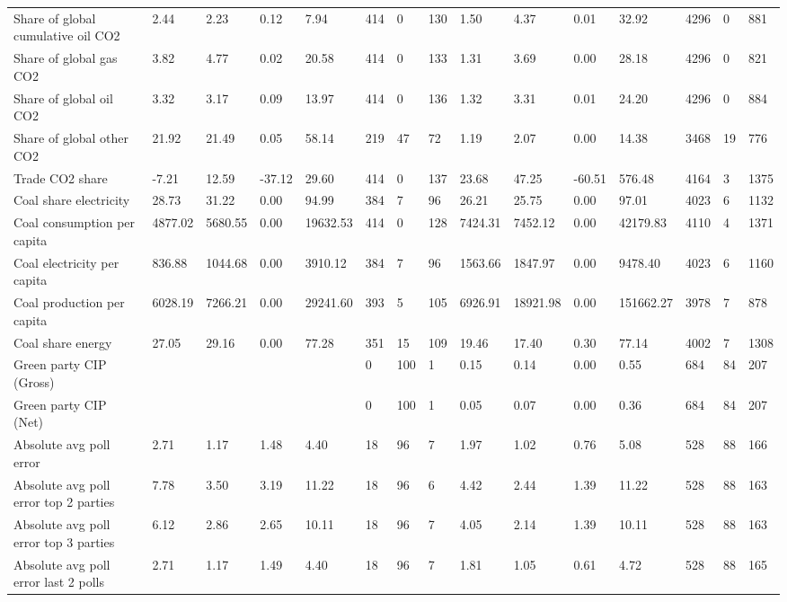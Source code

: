 \begin{longtable}{lllllllllllllll}
\addlinespace
Share of global cumulative oil CO2 & 2.44 & 2.23 & 0.12 & 7.94 & 414 & 0 & 130 & 1.50 & 4.37 & 0.01 & 32.92 & 4296 & 0 & 881\\
Share of global gas CO2 & 3.82 & 4.77 & 0.02 & 20.58 & 414 & 0 & 133 & 1.31 & 3.69 & 0.00 & 28.18 & 4296 & 0 & 821\\
Share of global oil CO2 & 3.32 & 3.17 & 0.09 & 13.97 & 414 & 0 & 136 & 1.32 & 3.31 & 0.01 & 24.20 & 4296 & 0 & 884\\
Share of global other CO2 & 21.92 & 21.49 & 0.05 & 58.14 & 219 & 47 & 72 & 1.19 & 2.07 & 0.00 & 14.38 & 3468 & 19 & 776\\
Trade CO2 share & -7.21 & 12.59 & -37.12 & 29.60 & 414 & 0 & 137 & 23.68 & 47.25 & -60.51 & 576.48 & 4164 & 3 & 1375\\
\addlinespace
Coal share electricity & 28.73 & 31.22 & 0.00 & 94.99 & 384 & 7 & 96 & 26.21 & 25.75 & 0.00 & 97.01 & 4023 & 6 & 1132\\
Coal consumption per capita & 4877.02 & 5680.55 & 0.00 & 19632.53 & 414 & 0 & 128 & 7424.31 & 7452.12 & 0.00 & 42179.83 & 4110 & 4 & 1371\\
Coal electricity per capita & 836.88 & 1044.68 & 0.00 & 3910.12 & 384 & 7 & 96 & 1563.66 & 1847.97 & 0.00 & 9478.40 & 4023 & 6 & 1160\\
Coal production per capita & 6028.19 & 7266.21 & 0.00 & 29241.60 & 393 & 5 & 105 & 6926.91 & 18921.98 & 0.00 & 151662.27 & 3978 & 7 & 878\\
Coal share energy & 27.05 & 29.16 & 0.00 & 77.28 & 351 & 15 & 109 & 19.46 & 17.40 & 0.30 & 77.14 & 4002 & 7 & 1308\\
\addlinespace
Green party CIP (Gross) &  &  &  &  & 0 & 100 & 1 & 0.15 & 0.14 & 0.00 & 0.55 & 684 & 84 & 207\\
Green party CIP (Net) &  &  &  &  & 0 & 100 & 1 & 0.05 & 0.07 & 0.00 & 0.36 & 684 & 84 & 207\\
Absolute avg poll error & 2.71 & 1.17 & 1.48 & 4.40 & 18 & 96 & 7 & 1.97 & 1.02 & 0.76 & 5.08 & 528 & 88 & 166\\
Absolute avg poll error top 2 parties & 7.78 & 3.50 & 3.19 & 11.22 & 18 & 96 & 6 & 4.42 & 2.44 & 1.39 & 11.22 & 528 & 88 & 163\\
Absolute avg poll error top 3 parties & 6.12 & 2.86 & 2.65 & 10.11 & 18 & 96 & 7 & 4.05 & 2.14 & 1.39 & 10.11 & 528 & 88 & 163\\
\addlinespace
Absolute avg poll error last 2 polls & 2.71 & 1.17 & 1.49 & 4.40 & 18 & 96 & 7 & 1.81 & 1.05 & 0.61 & 4.72 & 528 & 88 & 165\\

\end{longtable}
